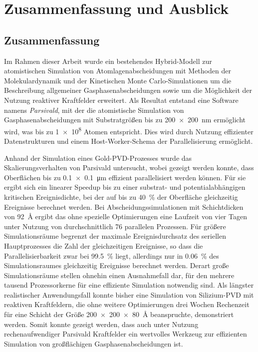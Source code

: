 \chapter{Zusammenfassung und Ausblick}
\label{summary}

\section{Zusammenfassung}

Im Rahmen dieser Arbeit wurde ein bestehendes Hybrid-Modell zur atomistischen Simulation von Atomlagenabscheidungen mit Methoden der Molekulardynamik und der Kinetischen Monte Carlo-Simulationen um die Beschreibung allgemeiner Gasphasenabscheidungen sowie um die Möglichkeit der Nutzung reaktiver Kraftfelder erweitert.
Als Resultat entstand eine Software namens \textit{Parsivald}, mit der die atomistische Simulation von Gasphasenabscheidungen mit Substratgrößen bis zu \SI{200x200}{\nano\meter} ermöglicht wird, was bis zu \num{1e8} Atomen entspricht.
Dies wird durch Nutzung effizienter Datenstrukturen und einem Host-Worker-Schema der Parallelisierung ermöglicht.


Anhand der Simulation eines Gold-PVD-Prozesses wurde das Skalierungsverhalten von Parsivald untersucht, wobei gezeigt werden konnte, dass Oberflächen bis zu \SI{0.1x0.1}{\micro\meter} effizient parallelisiert werden können.
Für sie ergibt sich ein linearer Speedup bis zu einer substrat- und potentialabhängigen kritischen Ereignisdichte, bei der auf bis zu \SI{40}{\percent} der Oberfläche gleichzeitig Ereignisse berechnet werden.
Bei Abscheidungssimulationen mit Schichtdicken von \SI{92}{\angstrom} ergibt das ohne spezielle Optimierungen eine Laufzeit von vier Tagen unter Nutzung von durchschnittlich \num{76} parallelen Prozessen.
Für größere Simulationsräume begrenzt der maximale Ereignisdurchsatz des seriellen Hauptprozesses die Zahl der gleichzeitigen Ereignisse, so dass die Parallelisierbarkeit zwar bei \SI{99.5}{\percent} liegt, allerdings nur in \SI{0.06}{\percent} des Simulationsraumes gleichzeitig Ereignisse berechnet werden.
Derart große Simulationsräume stellen ohnehin einen Ausnahmefall dar, für den mehrere tausend Prozessorkerne für eine effiziente Simulation notwendig sind.
Als längster realistischer Anwendungsfall konnte bisher eine Simulation von Silizium-PVD mit reaktiven Kraftfeldern, die ohne weitere Optimierungen drei Wochen Rechenzeit für eine Schicht der Größe \SI{200x200x80}{\angstrom} beanspruchte, demonstriert werden.
Somit konnte gezeigt werden, dass auch unter Nutzung rechenaufwendiger Parsivald Kraftfelder ein wertvolles Werkzeug zur effizienten Simulation von großflächigen Gasphasenabscheidungen ist.

